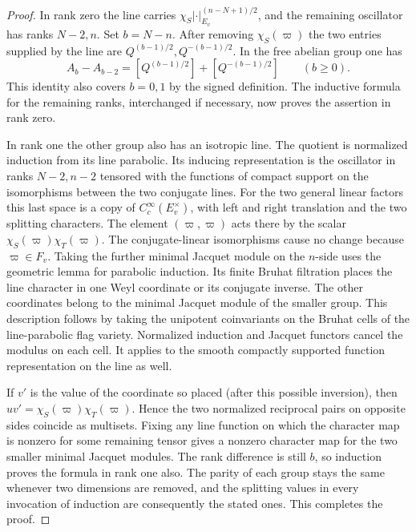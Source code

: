 \documentclass[a4paper,11pt]{article}
\theoremstyle{definition}
\theoremstyle{remark}
\numberwithin{equation}{section}
\begin{document}
\begin{proof}
In rank zero the line carries
\(\chi_S|\cdot|_{E_v}^{(n-N+1)/2}\), and the remaining
oscillator has ranks \(N-2,n\). Set \(b=N-n\). After
removing \(\chi_S(\varpi)\) the two entries supplied by
the line are \(Q^{(b-1)/2},Q^{-(b-1)/2}\). In the free
abelian group one has
\[
 A_b-A_{b-2}=[Q^{(b-1)/2}]+[Q^{-(b-1)/2}]
 \qquad(b\ge0).
\]
This identity also covers \(b=0,1\) by the signed definition.
The inductive formula for the remaining ranks, interchanged
if necessary, now proves the assertion in rank zero.

In rank one the other group also has an isotropic line.
The quotient is normalized induction from its line
parabolic. Its inducing representation is the oscillator
in ranks \(N-2,n-2\) tensored with the functions of compact
support on the isomorphisms between the two conjugate
lines. For the two general linear factors this last space
is a copy of \(C_c^\infty(E_v^\times)\), with left and right
translation and the two splitting characters. The element
\((\varpi,\varpi)\) acts there by the scalar
\(\chi_S(\varpi)\chi_T(\varpi)\). The conjugate-linear
isomorphisms cause no change because \(\varpi\in F_v\).
Taking the further minimal Jacquet module on the \(n\)-side
uses the geometric lemma for parabolic induction. Its finite
Bruhat filtration places the line character in one Weyl
coordinate or its conjugate inverse. The other coordinates
belong to the minimal Jacquet module of the smaller group.
This description follows by taking the unipotent coinvariants
on the Bruhat cells of the line-parabolic flag variety.
Normalized induction and Jacquet functors cancel the modulus
on each cell. It applies to the smooth compactly supported
function representation on the line as well.

If \(v'\) is the value of the coordinate so placed (after
this possible inversion), then
\(uv'=\chi_S(\varpi)\chi_T(\varpi)\). Hence the two
normalized reciprocal pairs on opposite sides coincide
as multisets. Fixing any line function on which the character
map is nonzero for some remaining tensor gives a nonzero
character map for the two smaller minimal Jacquet modules.
The rank difference is still \(b\), so induction proves
the formula in rank one also. The parity of each group
stays the same whenever two dimensions are removed, and
the splitting values in every invocation of induction
are consequently the stated ones. This completes the proof.
\end{proof}
\end{document}
